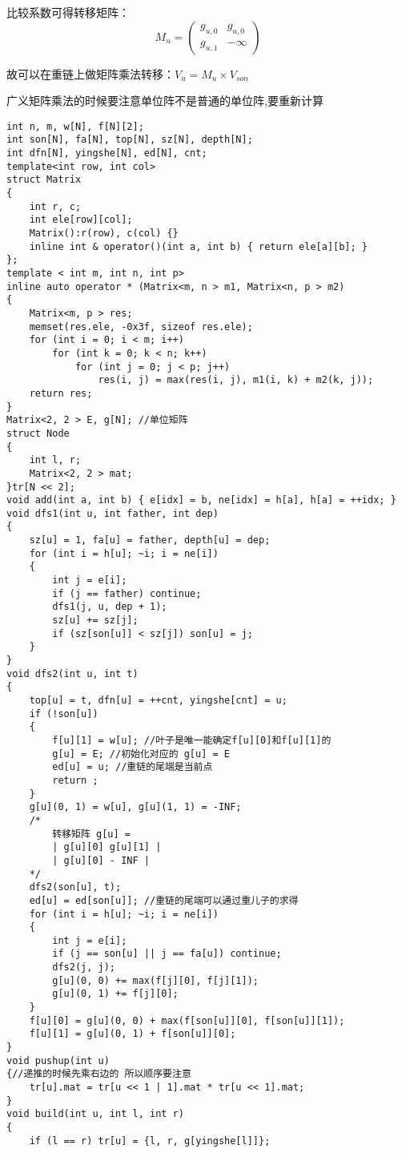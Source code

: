 \documentclass[a4paper, fontset=none]{ctexart}
\begin{document}
比较系数可得转移矩阵：
$$M_u = \begin{pmatrix}g_{u, 0} & g_{u, 0} \\ g_{u, 1} & -\infty\end{pmatrix}$$

故可以在重链上做矩阵乘法转移：$V_u = M_u \times V_{son}$

广义矩阵乘法的时候要注意单位阵不是普通的单位阵,要重新计算

\begin{verbatim}
int n, m, w[N], f[N][2];
int son[N], fa[N], top[N], sz[N], depth[N];
int dfn[N], yingshe[N], ed[N], cnt;
template<int row, int col>
struct Matrix
{
    int r, c;
    int ele[row][col];
    Matrix():r(row), c(col) {}
    inline int & operator()(int a, int b) { return ele[a][b]; }
};
template < int m, int n, int p>
inline auto operator * (Matrix<m, n > m1, Matrix<n, p > m2)
{
    Matrix<m, p > res;
    memset(res.ele, -0x3f, sizeof res.ele);
    for (int i = 0; i < m; i++)
        for (int k = 0; k < n; k++)
            for (int j = 0; j < p; j++)
                res(i, j) = max(res(i, j), m1(i, k) + m2(k, j));
    return res;
}
Matrix<2, 2 > E, g[N]; //单位矩阵
struct Node
{
    int l, r;
    Matrix<2, 2 > mat;
}tr[N << 2];
void add(int a, int b) { e[idx] = b, ne[idx] = h[a], h[a] = ++idx; }
void dfs1(int u, int father, int dep)
{
    sz[u] = 1, fa[u] = father, depth[u] = dep;
    for (int i = h[u]; ~i; i = ne[i])
    {
        int j = e[i];
        if (j == father) continue;
        dfs1(j, u, dep + 1);
        sz[u] += sz[j];
        if (sz[son[u]] < sz[j]) son[u] = j;
    }
}
void dfs2(int u, int t)
{
    top[u] = t, dfn[u] = ++cnt, yingshe[cnt] = u;
    if (!son[u])
    {
        f[u][1] = w[u]; //叶子是唯一能确定f[u][0]和f[u][1]的
        g[u] = E; //初始化对应的 g[u] = E
        ed[u] = u; //重链的尾端是当前点
        return ;
    }
    g[u](0, 1) = w[u], g[u](1, 1) = -INF;
    /*
        转移矩阵 g[u] =
        | g[u][0] g[u][1] |
        | g[u][0] - INF |
    */
    dfs2(son[u], t);
    ed[u] = ed[son[u]]; //重链的尾端可以通过重儿子的求得
    for (int i = h[u]; ~i; i = ne[i])
    {
        int j = e[i];
        if (j == son[u] || j == fa[u]) continue;
        dfs2(j, j);
        g[u](0, 0) += max(f[j][0], f[j][1]);
        g[u](0, 1) += f[j][0];
    }
    f[u][0] = g[u](0, 0) + max(f[son[u]][0], f[son[u]][1]);
    f[u][1] = g[u](0, 1) + f[son[u]][0];
}
void pushup(int u)
{//递推的时候先乘右边的 所以顺序要注意
    tr[u].mat = tr[u << 1 | 1].mat * tr[u << 1].mat;
}
void build(int u, int l, int r)
{
    if (l == r) tr[u] = {l, r, g[yingshe[l]]};

\end{verbatim}
\end{document}
